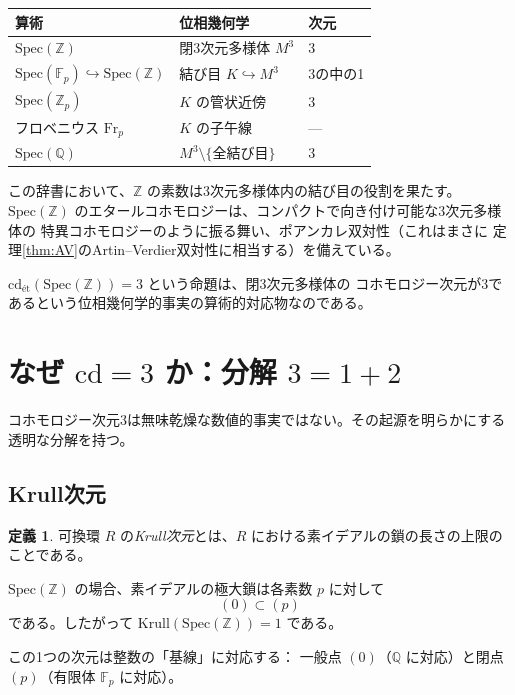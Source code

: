 \documentclass[12pt,a4paper]{article}
\theoremstyle{definition}
\newtheorem{definition}[theorem]{定義}
\newcommand{\Spec}{\mathrm{Spec}}
\newcommand{\cd}{\mathrm{cd}}
\newcommand{\Krull}{\mathrm{Krull}}
\newcommand{\ZZ}{\mathbb{Z}}
\newcommand{\QQ}{\mathbb{Q}}
\newcommand{\FF}{\mathbb{F}}
\begin{document}
\begin{center}
\begin{tabular}{lll}
\toprule
\textbf{算術} & \textbf{位相幾何学} & \textbf{次元} \\
\midrule
$\Spec(\ZZ)$ & 閉3次元多様体 $M^3$ & 3 \\
$\Spec(\FF_p) \hookrightarrow \Spec(\ZZ)$ & 結び目 $K \hookrightarrow M^3$ & 3の中の1 \\
$\Spec(\ZZ_p)$ & $K$ の管状近傍 & 3 \\
フロベニウス $\mathrm{Fr}_p$ & $K$ の子午線 & --- \\
$\Spec(\QQ)$ & $M^3 \setminus \{\text{全結び目}\}$ & 3 \\
\bottomrule
\end{tabular}
\end{center}

この辞書において、$\ZZ$ の素数は3次元多様体内の結び目の役割を果たす。
$\Spec(\ZZ)$ のエタールコホモロジーは、コンパクトで向き付け可能な3次元多様体の
特異コホモロジーのように振る舞い、ポアンカレ双対性（これはまさに
定理\ref{thm:AV}のArtin--Verdier双対性に相当する）を備えている。

$\cd_{\text{\'et}}(\Spec(\ZZ)) = 3$ という命題は、閉3次元多様体の
コホモロジー次元が3であるという位相幾何学的事実の算術的対応物なのである。

\section{なぜ $\cd = 3$ か：分解 $3 = 1 + 2$}\label{sec:decomposition}

コホモロジー次元3は無味乾燥な数値的事実ではない。その起源を明らかにする
透明な分解を持つ。

\subsection{Krull次元}

\begin{definition}
可換環 $R$ の\emph{Krull次元}とは、$R$ における素イデアルの鎖の長さの上限のことである。
\end{definition}

$\Spec(\ZZ)$ の場合、素イデアルの極大鎖は各素数 $p$ に対して
\[
  (0) \subset (p)
\]
である。したがって $\Krull(\Spec(\ZZ)) = 1$ である。

この1つの次元は整数の「基線」に対応する：
一般点 $(0)$（$\QQ$ に対応）と閉点 $(p)$（有限体 $\FF_p$ に対応）。
\end{document}
